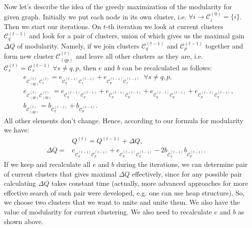 Now let's describe the idea of the greedy maximization of the modularity for given graph.
Initially we put each node in its own cluster, i.e. $\forall i \rightarrow \mathcal{C}^{(0)}_i = \{ i \}$.
Then we start our iterations. On $t$-th iteration we look at current clusters $\mathcal{C}^{(t-1)}_q$ and look for a pair of clusters, union of which gives us the maximal gain $\Delta Q$ of modularity. 
Namely, if we join clusters ${\mathcal{C}^{(t-1)}_q}$ and ${\mathcal{C}^{(t-1)}_p}$ together and form new cluster $\mathcal{C}^{(t)}_{(qp)}$ and leave all other clusters as they are, i.e. $\mathcal{C}^{(t)}_s = \mathcal{C}^{(t-1)}_s \; \forall s\neq q,p$, then $e$ and $b$ can be recalculated as follows:
\begin{equation}
    \begin{aligned}
        & e_{\mathcal{C}^{(t)}_{(qp)} \mathcal{C}^{(t)}_s} = e_{{\mathcal{C}^{(t-1)}_q}{\mathcal{C}^{(t-1)}_s}} + e_{{\mathcal{C}^{(t-1)}_p}{\mathcal{C}^{(t-1)}_s}} \;\; \forall s \neq q,p,\\
        & e_{\mathcal{C}^{(t)}_{(qp)} \mathcal{C}^{(t)}_{(qp)}} = e_{{\mathcal{C}^{(t-1)}_q}{\mathcal{C}^{(t-1)}_q}} +
        e_{{\mathcal{C}^{(t-1)}_p}{\mathcal{C}^{(t-1)}_p}} + e_{{\mathcal{C}^{(t-1)}_q}{\mathcal{C}^{(t-1)}_p}} + e_{{\mathcal{C}^{(t-1)}_p}{\mathcal{C}^{(t-1)}_q}},\\
        & b_{\mathcal{C}^{(t)}_{(qp)}} = b_{\mathcal{C}^{(t-1)}_{q}} + b_{\mathcal{C}^{(t-1)}_{p}}.
    \nonumber
    \end{aligned}
\end{equation}
All other elements don't change. Hence, according to our formula for modularity we have:
\begin{equation}
    \begin{aligned}
        &Q^{(t)} = Q^{(t-1)} + \Delta Q,\\
        \Delta Q = 
        &e_{{\mathcal{C}^{(t-1)}_q}{\mathcal{C}^{(t-1)}_p}} + e_{{\mathcal{C}^{(t-1)}_p}{\mathcal{C}^{(t-1)}_q}} 
        - 2b_{\mathcal{C}^{(t-1)}_{q}}  b_{\mathcal{C}^{(t-1)}_{p}}.
    \nonumber
    \end{aligned}
\end{equation}
If we keep and recalculate all $e$ and $b$ during the iterations, we can determine pair of current clusters that gives maximal $\Delta Q$ effectively, since for any possible pair calculating $\Delta Q$ takes constant time (actually, more advanced approaches for more effective search of such pair were developed, e.g. one can use heap structure). So, we choose two clusters that we want to unite and unite them. We also have the value of modularity for current clustering. We also need to recalculate $e$ and $b$ as shown above.

